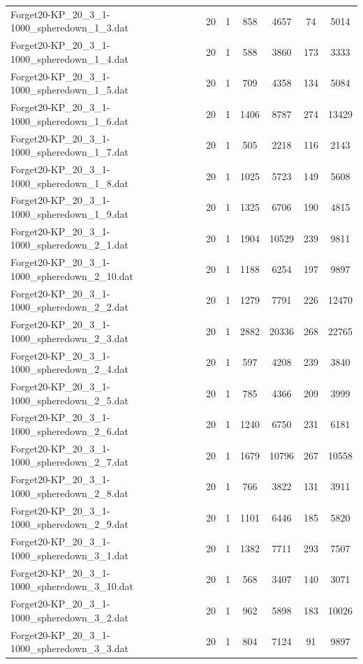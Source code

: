\begin{table}[!ht]
\begin{tabular}{lcccccc}
Forget20-KP\_20\_3\_1-1000\_spheredown\_1\_3.dat & 20 & 1 & 858 & 4657 & 74 & 5014 \\
Forget20-KP\_20\_3\_1-1000\_spheredown\_1\_4.dat & 20 & 1 & 588 & 3860 & 173 & 3333 \\
Forget20-KP\_20\_3\_1-1000\_spheredown\_1\_5.dat & 20 & 1 & 709 & 4358 & 134 & 5084 \\
Forget20-KP\_20\_3\_1-1000\_spheredown\_1\_6.dat & 20 & 1 & 1406 & 8787 & 274 & 13429 \\
Forget20-KP\_20\_3\_1-1000\_spheredown\_1\_7.dat & 20 & 1 & 505 & 2218 & 116 & 2143 \\
Forget20-KP\_20\_3\_1-1000\_spheredown\_1\_8.dat & 20 & 1 & 1025 & 5723 & 149 & 5608 \\
Forget20-KP\_20\_3\_1-1000\_spheredown\_1\_9.dat & 20 & 1 & 1325 & 6706 & 190 & 4815 \\
Forget20-KP\_20\_3\_1-1000\_spheredown\_2\_1.dat & 20 & 1 & 1904 & 10529 & 239 & 9811 \\
Forget20-KP\_20\_3\_1-1000\_spheredown\_2\_10.dat & 20 & 1 & 1188 & 6254 & 197 & 9897 \\
Forget20-KP\_20\_3\_1-1000\_spheredown\_2\_2.dat & 20 & 1 & 1279 & 7791 & 226 & 12470 \\
Forget20-KP\_20\_3\_1-1000\_spheredown\_2\_3.dat & 20 & 1 & 2882 & 20336 & 268 & 22765 \\
Forget20-KP\_20\_3\_1-1000\_spheredown\_2\_4.dat & 20 & 1 & 597 & 4208 & 239 & 3840 \\
Forget20-KP\_20\_3\_1-1000\_spheredown\_2\_5.dat & 20 & 1 & 785 & 4366 & 209 & 3999 \\
Forget20-KP\_20\_3\_1-1000\_spheredown\_2\_6.dat & 20 & 1 & 1240 & 6750 & 231 & 6181 \\
Forget20-KP\_20\_3\_1-1000\_spheredown\_2\_7.dat & 20 & 1 & 1679 & 10796 & 267 & 10558 \\
Forget20-KP\_20\_3\_1-1000\_spheredown\_2\_8.dat & 20 & 1 & 766 & 3822 & 131 & 3911 \\
Forget20-KP\_20\_3\_1-1000\_spheredown\_2\_9.dat & 20 & 1 & 1101 & 6446 & 185 & 5820 \\
Forget20-KP\_20\_3\_1-1000\_spheredown\_3\_1.dat & 20 & 1 & 1382 & 7711 & 293 & 7507 \\
Forget20-KP\_20\_3\_1-1000\_spheredown\_3\_10.dat & 20 & 1 & 568 & 3407 & 140 & 3071 \\
Forget20-KP\_20\_3\_1-1000\_spheredown\_3\_2.dat & 20 & 1 & 962 & 5898 & 183 & 10026 \\
Forget20-KP\_20\_3\_1-1000\_spheredown\_3\_3.dat & 20 & 1 & 804 & 7124 & 91 & 9897 \\

\end{tabular}
\end{table}
